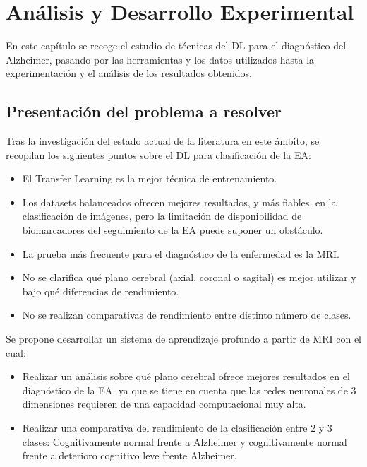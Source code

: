 \chapter{Análisis y Desarrollo Experimental}\label{ch:analisis-y-desarrollo-experimental}
En este capítulo se recoge el estudio de técnicas del DL para el diagnóstico del Alzheimer, pasando por las 
herramientas y los datos utilizados hasta la experimentación y el análisis de los resultados obtenidos.

\section{Presentación del problema a resolver}\label{sec:presentacion-del-problema-a-resolver}
Tras la investigación del estado actual de la literatura en este ámbito, se recopilan los siguientes puntos sobre el DL
para clasificación de la EA:

\begin{itemize}
    \item El Transfer Learning es la mejor técnica de entrenamiento.
    \item Los datasets balanceados ofrecen mejores resultados, y más fiables, en la clasificación de imágenes,
    pero la limitación de disponibilidad de biomarcadores del seguimiento de la EA puede suponer un obstáculo.
    \item La prueba más frecuente para el diagnóstico de la enfermedad es la MRI.
    \item No se clarifica qué plano cerebral (axial, coronal o sagital) es mejor utilizar y bajo qué diferencias de
    rendimiento.
    \item No se realizan comparativas de rendimiento entre distinto número de clases. \\
\end{itemize}

Se propone desarrollar un sistema de aprendizaje profundo a partir de MRI con el cual:

\begin{itemize}
    \item Realizar un análisis sobre qué plano cerebral ofrece mejores resultados en el diagnóstico de la EA, ya que se
    tiene en cuenta que las redes neuronales de 3 dimensiones requieren de una capacidad computacional muy alta.
    \item Realizar una comparativa del rendimiento de la clasificación entre 2 y 3 clases: Cognitivamente normal frente 
    a Alzheimer y cognitivamente normal frente a deterioro cognitivo leve frente Alzheimer. \\
\end{itemize}

